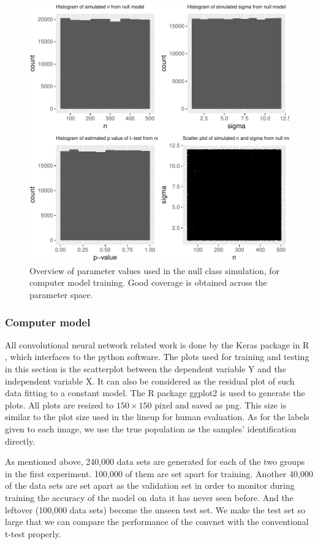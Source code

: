 \documentclass[12pt]{article}
\begin{document}
\begin{figure}
\centering
\includegraphics{pc_plots_files/figure-latex/simp-1.pdf}
\caption{Overview of parameter values used in the null class simulation,
for computer model training. Good coverage is obtained across the
parameter space.}
\end{figure}

\subsubsection{Computer model}\label{computer-model}

All convolutional neural network related work is done by the Keras
\citep{keras} package in R \citep{R}, which interfaces to the python
software. The plots used for training and testing in this section is the
scatterplot between the dependent variable Y and the independent
variable X. It can also be considered as the residual plot of such data
fitting to a constant model. The R package ggplot2 \citep{ggplot2} is
used to generate the plots. All plots are resized to \(150\times 150\)
pixel and saved as png. This size is similar to the plot size used in
the lineup for human evaluation. As for the labels given to each image,
we use the true population as the samples' identification directly.

As mentioned above, 240,000 data sets are generated for each of the two
groups in the first experiment. 100,000 of them are set apart for
training. Another 40,000 of the data sets are set apart as the
validation set in order to monitor during training the accuracy of the
model on data it has never seen before. And the leftover (100,000 data
sets) become the unseen test set. We make the test set so large that we
can compare the performance of the convnet with the conventional t-test
properly.
\end{document}
